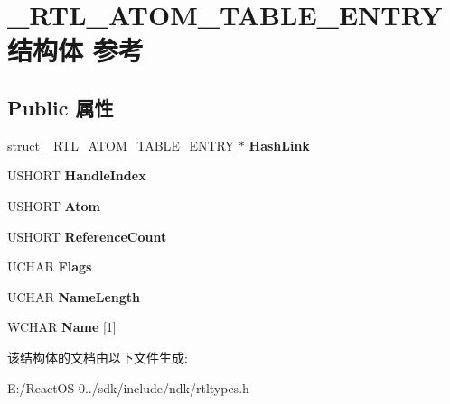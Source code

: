 \hypertarget{struct___r_t_l___a_t_o_m___t_a_b_l_e___e_n_t_r_y}{}\section{\+\_\+\+R\+T\+L\+\_\+\+A\+T\+O\+M\+\_\+\+T\+A\+B\+L\+E\+\_\+\+E\+N\+T\+R\+Y结构体 参考}
\label{struct___r_t_l___a_t_o_m___t_a_b_l_e___e_n_t_r_y}
\subsection*{Public 属性}
\begin{DoxyCompactItemize}
\item 
\mbox{\label{struct___r_t_l___a_t_o_m___t_a_b_l_e___e_n_t_r_y_ab59630fde45c82872506188237e63400}} 
\hyperlink{interfacestruct}{struct} \hyperlink{struct___r_t_l___a_t_o_m___t_a_b_l_e___e_n_t_r_y}{\+\_\+\+R\+T\+L\+\_\+\+A\+T\+O\+M\+\_\+\+T\+A\+B\+L\+E\+\_\+\+E\+N\+T\+RY} $\ast$ {\bfseries Hash\+Link}
\item 
\mbox{\label{struct___r_t_l___a_t_o_m___t_a_b_l_e___e_n_t_r_y_aa703261fb967de35d6451f4ba30d5025}} 
U\+S\+H\+O\+RT {\bfseries Handle\+Index}
\item 
\mbox{\label{struct___r_t_l___a_t_o_m___t_a_b_l_e___e_n_t_r_y_a2e84766350d0f9683e3b8340653d575f}} 
U\+S\+H\+O\+RT {\bfseries Atom}
\item 
\mbox{\label{struct___r_t_l___a_t_o_m___t_a_b_l_e___e_n_t_r_y_a9f276e9265b31de1df3874572a47bfe8}} 
U\+S\+H\+O\+RT {\bfseries Reference\+Count}
\item 
\mbox{\label{struct___r_t_l___a_t_o_m___t_a_b_l_e___e_n_t_r_y_a6ab0bff6eeb7fbe9523045fa0afb99fb}} 
U\+C\+H\+AR {\bfseries Flags}
\item 
\mbox{\label{struct___r_t_l___a_t_o_m___t_a_b_l_e___e_n_t_r_y_a23485944c478a07b22db717d94505bdf}} 
U\+C\+H\+AR {\bfseries Name\+Length}
\item 
\mbox{\label{struct___r_t_l___a_t_o_m___t_a_b_l_e___e_n_t_r_y_adb5f2a26f261e19d86e49f615c14a781}} 
W\+C\+H\+AR {\bfseries Name} \mbox{[}1\mbox{]}
\end{DoxyCompactItemize}


该结构体的文档由以下文件生成\+:\begin{DoxyCompactItemize}
\item 
E\+:/\+React\+O\+S-\/0../sdk/include/ndk/rtltypes.\+h\end{DoxyCompactItemize}
